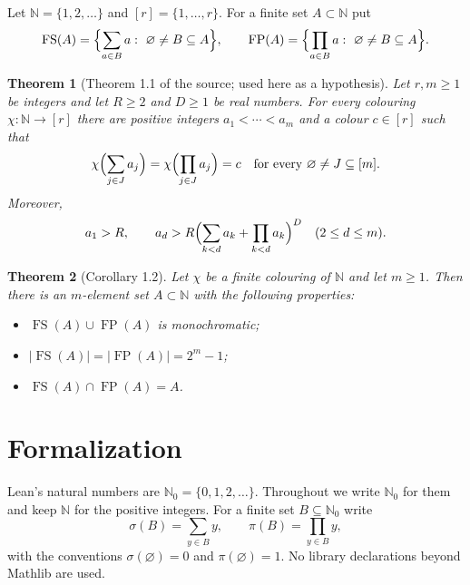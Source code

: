 \documentclass[11pt]{article}
\newtheorem{theorem}{Theorem}[section]
\theoremstyle{definition}
\theoremstyle{remark}
\DeclareMathOperator{\FS}{FS}
\DeclareMathOperator{\FP}{FP}
\newcommand{\NN}{\mathbb{N}}
\newcommand{\Nz}{\mathbb{N}_0}
\begin{document}
Let $\NN=\{1,2,\ldots\}$ and $[r]=\{1,\ldots,r\}$. For a finite set $A\subset\NN$ put
\[
 \FS(A)=\Bigl\{\sum_{a\in B}a:\ \varnothing\ne B\subseteq A\Bigr\},\qquad
 \FP(A)=\Bigl\{\prod_{a\in B}a:\ \varnothing\ne B\subseteq A\Bigr\}.
\]

\begin{theorem}[Theorem 1.1 of the source; used here as a hypothesis]
Let $r,m\ge 1$ be integers and let $R\ge 2$ and $D\ge 1$ be real numbers. For every colouring $\chi:\NN\to[r]$ there are positive integers $a_1<\cdots<a_m$ and a colour $c\in[r]$ such that
\[
\chi\Bigl(\sum_{j\in J}a_j\Bigr)=\chi\Bigl(\prod_{j\in J}a_j\Bigr)=c
\quad\text{for every } \varnothing\ne J\subseteq[m].
\]
Moreover,
\[
 a_1>R,\qquad a_d>R\Bigl(\sum_{k<d}a_k+\prod_{k<d}a_k\Bigr)^D\quad(2\le d\le m).
\]
\end{theorem}

\begin{theorem}[Corollary 1.2]
Let $\chi$ be a finite colouring of $\NN$ and let $m\ge 1$. Then there is an $m$-element set $A\subset\NN$ with the following properties:
\begin{itemize}
 \item $\FS(A)\cup\FP(A)$ is monochromatic;
 \item $|\FS(A)|=|\FP(A)|=2^m-1$;
 \item $\FS(A)\cap\FP(A)=A$.
\end{itemize}
\end{theorem}

\section{Formalization}

Lean's natural numbers are $\Nz=\{0,1,2,\ldots\}$. Throughout we write $\Nz$ for them and keep $\NN$ for the positive integers. For a finite set $B\subseteq\Nz$ write
\[
\sigma(B)=\sum_{y\in B}y,\qquad \pi(B)=\prod_{y\in B}y,
\]
with the conventions $\sigma(\varnothing)=0$ and $\pi(\varnothing)=1$. No library declarations beyond Mathlib are used.
\end{document}
